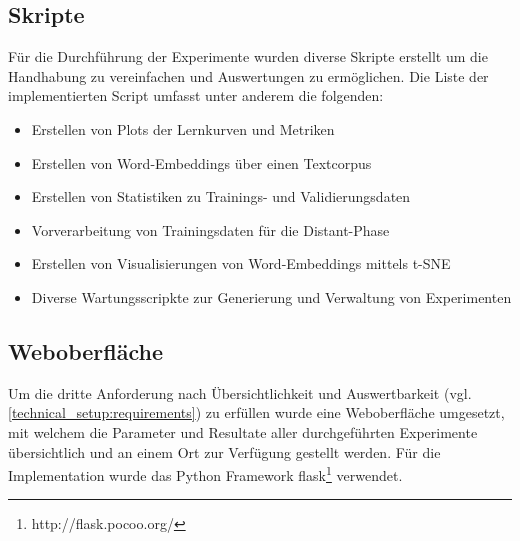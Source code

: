 \subsection{Skripte}
\label{technical_setup:scripts}
Für die Durchführung der Experimente wurden diverse Skripte erstellt um die Handhabung zu vereinfachen und Auswertungen zu ermöglichen. Die Liste der implementierten Script umfasst unter anderem die folgenden:

\begin{itemize}[noitemsep]
	\item Erstellen von Plots der Lernkurven und Metriken
	\item Erstellen von Word-Embeddings über einen Textcorpus
	\item Erstellen von Statistiken zu Trainings- und Validierungsdaten
	\item Vorverarbeitung von Trainingsdaten für die Distant-Phase
	\item Erstellen von Visualisierungen von Word-Embeddings mittels t-SNE \cite{maaten2008visualizing}
	\item Diverse Wartungsscripkte zur Generierung und Verwaltung von Experimenten
\end{itemize}

\subsection{Weboberfläche}
\label{technical_setup:webgui}
Um die dritte Anforderung nach Übersichtlichkeit und Auswertbarkeit (vgl. \ref{technical_setup:requirements}) zu erfüllen wurde eine Weboberfläche umgesetzt, mit welchem die Parameter und Resultate aller durchgeführten Experimente übersichtlich und an einem Ort zur Verfügung gestellt werden. Für die Implementation wurde das Python Framework flask\footnote{http://flask.pocoo.org/} verwendet.


